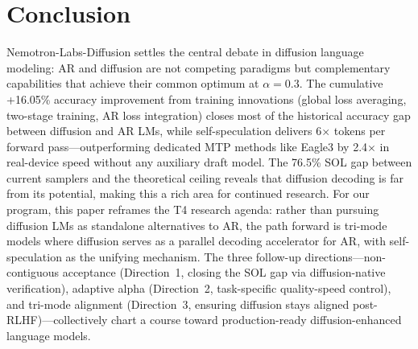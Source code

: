 \documentclass[11pt,a4paper]{article}
\begin{document}
\section{Conclusion}

Nemotron-Labs-Diffusion settles the central debate in diffusion language modeling: AR and diffusion are not competing paradigms but complementary capabilities that achieve their common optimum at $\alpha = 0.3$. The cumulative +16.05\% accuracy improvement from training innovations (global loss averaging, two-stage training, AR loss integration) closes most of the historical accuracy gap between diffusion and AR LMs, while self-speculation delivers 6$\times$ tokens per forward pass---outperforming dedicated MTP methods like Eagle3 by 2.4$\times$ in real-device speed without any auxiliary draft model. The 76.5\% SOL gap between current samplers and the theoretical ceiling reveals that diffusion decoding is far from its potential, making this a rich area for continued research. For our program, this paper reframes the T4 research agenda: rather than pursuing diffusion LMs as standalone alternatives to AR, the path forward is tri-mode models where diffusion serves as a parallel decoding accelerator for AR, with self-speculation as the unifying mechanism. The three follow-up directions---non-contiguous acceptance (Direction~1, closing the SOL gap via diffusion-native verification), adaptive alpha (Direction~2, task-specific quality-speed control), and tri-mode alignment (Direction~3, ensuring diffusion stays aligned post-RLHF)---collectively chart a course toward production-ready diffusion-enhanced language models.
\end{document}
